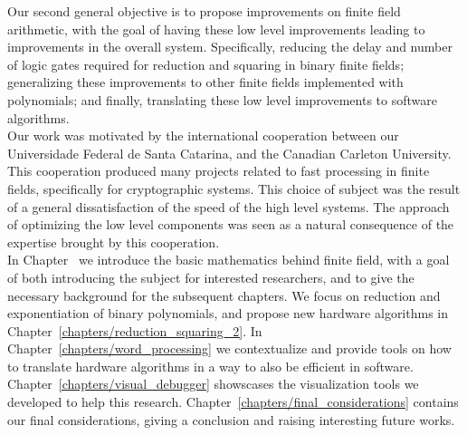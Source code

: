 Our second general objective is to propose improvements on finite field arithmetic, with the goal of having these low level improvements leading to improvements in the overall system. Specifically, reducing the delay and number of logic gates required for reduction and squaring in binary finite fields; generalizing these improvements to other finite fields implemented with polynomials; and finally, translating these low level improvements to software algorithms. \\

Our work was motivated by the international cooperation between our Universidade Federal de Santa Catarina, and the Canadian Carleton University. This cooperation produced many projects related to fast processing in finite fields, specifically for cryptographic systems. This choice of subject was the result of a general dissatisfaction of the speed of the high level systems. The approach of optimizing the low level components was seen as a natural consequence of the expertise brought by this cooperation. \\

In Chapter~\label{cap:background} we introduce the basic mathematics behind finite field, with a goal of both introducing the subject for interested researchers, and to give the necessary background for the subsequent chapters. We focus on reduction and exponentiation of binary polynomials, and propose new hardware algorithms in Chapter~\ref{chapters/reduction_squaring_2}. In Chapter~\ref{chapters/word_processing} we contextualize and provide tools on how to translate hardware algorithms in a way to also be efficient in software. Chapter~\ref{chapters/visual_debugger} showscases the visualization tools we developed to help this research. Chapter~\ref{chapters/final_considerations} contains our final considerations, giving a conclusion and raising interesting future works. \\


%
%
%
%
